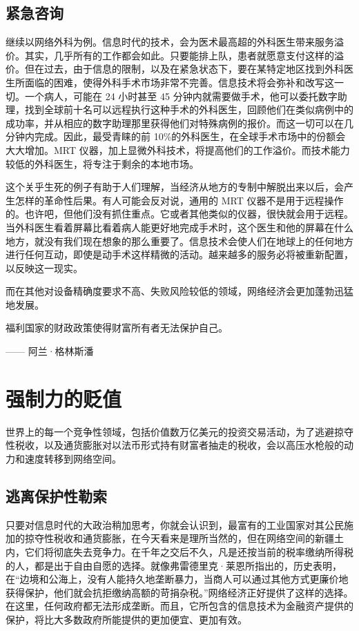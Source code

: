 \subsection{紧急咨询}
继续以网络外科为例。信息时代的技术，会为医术最高超的外科医生带来服务溢价。其实，几乎所有的工作都会如此。只要能排上队，患者就愿意支付这样的溢价。但在过去，由于信息的限制，以及在紧急状态下，要在某特定地区找到外科医生所面临的困难，使得外科手术市场非常不完善。信息技术将会弥补和改写这一切。一个病人，可能在 24 小时甚至 45 分钟内就需要做手术，他可以委托数字助理，找到全球前十名可以远程执行这种手术的外科医生，回顾他们在类似病例中的成功率，并从相应的数字助理那里获得他们对特殊病例的报价。而这一切可以在几分钟内完成。因此，最受青睐的前 10\%的外科医生，在全球手术市场中的份额会大大增加。MRT 仪器，加上显微外科技术，将提高他们的工作溢价。而技术能力较低的外科医生，将专注于剩余的本地市场。

这个关乎生死的例子有助于人们理解，当经济从地方的专制中解脱出来以后，会产生怎样的革命性后果。有人可能会反对说，通用的 MRT 仪器不是用于远程操作的。也许吧，但他们没有抓住重点。它或者其他类似的仪器，很快就会用于远程。当外科医生看着屏幕比看着病人能更好地完成手术时，这个医生和他的屏幕在什么地方，就没有我们现在想象的那么重要了。信息技术会使人们在地球上的任何地方进行任何互动，即使是动手术这样精微的活动。越来越多的服务必将被重新配置，以反映这一现实。

而在其他对设备精确度要求不高、失败风险较低的领域，网络经济会更加蓬勃迅猛地发展。

\begin{tcolorbox}
福利国家的财政政策使得财富所有者无法保护自己。
\begin{flushright}
—— 阿兰·格林斯潘    
\end{flushright}
\end{tcolorbox}


\section{强制力的贬值}
世界上的每一个竞争性领域，包括价值数万亿美元的投资交易活动，为了逃避掠夺性税收，以及通货膨胀对以法币形式持有财富者抽走的税收，会以高压水枪般的动力和速度转移到网络空间。

\subsection{逃离保护性勒索}
只要对信息时代的大政治稍加思考，你就会认识到，最富有的工业国家对其公民施加的掠夺性税收和通货膨胀，在今天看来是理所当然的，但在网络空间的新疆土内，它们将彻底失去竞争力。在千年之交后不久，凡是还按当前的税率缴纳所得税的人，都是出于自由自愿的选择。就像弗雷德里克·莱恩所指出的，历史表明，在“边境和公海上，没有人能持久地垄断暴力，当商人可以通过其他方式更廉价地获得保护，他们就会抗拒缴纳高额的苛捐杂税。”网络经济正好提供了这样的选择。在这里，任何政府都无法形成垄断。而且，它所包含的信息技术为金融资产提供的保护，将比大多数政府所能提供的更加便宜、更加有效。

